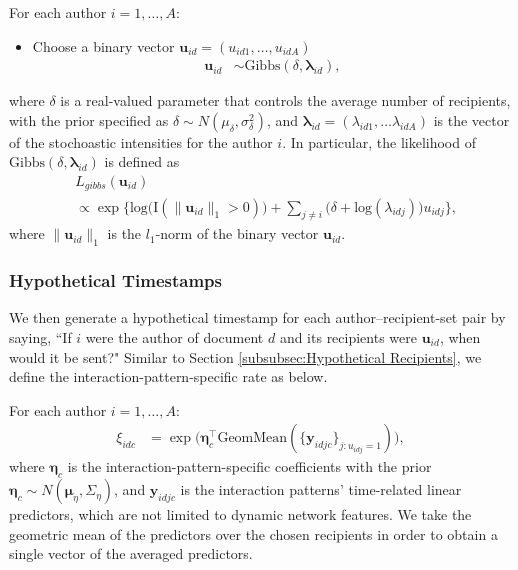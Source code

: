 \documentclass[twoside]{article}
\begin{document}
For each author $i =1,\ldots,A$:
\begin{itemize}
	\item Choose a binary vector $\boldsymbol{u}_{id}= (u_{id1},
	\ldots, u_{idA})$
\begin{align*} \boldsymbol{u}_{id} & \sim
\mbox{Gibbs}(\delta, \boldsymbol{\lambda}_{id}),
\end{align*}
\end{itemize}
	where $\delta$ is a real-valued parameter that controls the average number of recipients, with the prior specified as $\delta \sim N(\mu_\delta,\sigma^2_\delta)$, and $\boldsymbol{\lambda}_{id}=(\lambda_{id1},\ldots\lambda_{idA})$ is the vector of the stochoastic intensities for the author $i$. In particular, the likelihood of $\mbox{Gibbs}(\delta, \boldsymbol{\lambda}_{id})$ is defined as
	\begin{align*}
	&L_{gibbs}(\boldsymbol{u}_{id}) \\&\propto \exp\Big\{\mbox{log}\Big(\text{I}( \lVert \boldsymbol{u}_{id}\rVert_1 > 0 )\Big) + \sum_{j \neq i} \Big(\delta+\mbox{log}(\lambda_{idj})\Big)u_{idj}\Big\},
	\end{align*}
where $\lVert \boldsymbol{u}_{id}\rVert_1$ is the $l_1$-norm of the binary vector $\boldsymbol{u}_{id}$.
\subsubsection{Hypothetical Timestamps}\label{subsubsec:Hypothetical Timestamps}
We then generate a hypothetical timestamp for each author--recipient-set pair by saying, ``If $i$ were the author of document $d$ and its recipients were $\boldsymbol{u}_{id}$, when would it be sent?" Similar to Section \ref{subsubsec:Hypothetical Recipients}, we define the interaction-pattern-specific rate as below.

For each author $i =1,\ldots,A$:
\begin{align*}
\xi_{idc}& = \exp\Big(\boldsymbol{\eta}_c^\top\mbox{GeomMean}(\{ \boldsymbol{y}_{idjc}\}_{j:u_{idj}= 1})\Big),
\end{align*}
where $\boldsymbol{\eta}_c$ is the interaction-pattern-specific coefficients with the prior $\boldsymbol{\eta}_c \sim N(\boldsymbol{\mu}_\eta,\Sigma_\eta)$, and $\boldsymbol{y}_{idjc}$ is the interaction patterns' time-related linear predictors, which are not limited to dynamic network features. We take the geometric mean of the predictors over the chosen recipients in order to obtain a single vector of the averaged predictors. 
\end{document}
